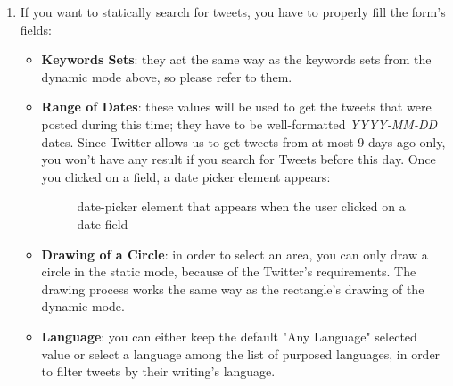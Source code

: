 \documentclass[a4paper,11pt]{report}
\begin{document}
\begin{enumerate}
	\item If you want to statically search for tweets, you have to properly fill the form's fields:
	\begin{itemize}
		\item \textbf{Keywords Sets}: they act the same way as the keywords sets from the dynamic mode above, so please refer to them.
		\item \textbf{Range of Dates}: these values will be used to get the tweets that were posted during this time; they have to be well-formatted \emph{YYYY-MM-DD} dates. Since Twitter allows us to get tweets from at most 9 days ago only, you won't have any result if you search for Tweets before this day. Once you clicked on a field, a date picker element appears:
		\begin{figure}[H]
		\vspace{-5pt}
		\begin{center}
		\vspace{-5pt}
		\caption{date-picker element that appears when the user clicked on a date field}
		\end{center}
		\end{figure}
		\vspace{-10pt}
		
		\item \textbf{Drawing of a Circle}: in order to select an area, you can only draw a circle in the static mode, because of the Twitter's requirements. The drawing process works the same way as the rectangle's drawing of the dynamic mode.
		\item \textbf{Language}: you can either keep the default "Any Language" selected value or select a language among the list of purposed languages, in order to filter tweets by their writing's language.
	\end{itemize}
	

\end{enumerate}
\end{document}
